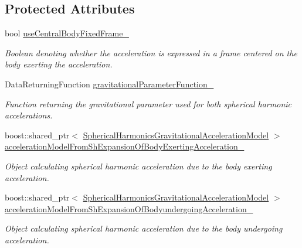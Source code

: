 \subsection*{Protected Attributes}
\begin{DoxyCompactItemize}
\item 
bool \hyperlink{classtudat_1_1gravitation_1_1MutualSphericalHarmonicsGravitationalAccelerationModel_aebd70be134dd6b05ae3c322c129dd848}{use\+Central\+Body\+Fixed\+Frame\+\_\+}
\begin{DoxyCompactList}\small\item\em Boolean denoting whether the acceleration is expressed in a frame centered on the body exerting the acceleration. \end{DoxyCompactList}\item 
Data\+Returning\+Function \hyperlink{classtudat_1_1gravitation_1_1MutualSphericalHarmonicsGravitationalAccelerationModel_a25e4191f473af6700db45554ec375374}{gravitational\+Parameter\+Function\+\_\+}\hypertarget{classtudat_1_1gravitation_1_1MutualSphericalHarmonicsGravitationalAccelerationModel_a25e4191f473af6700db45554ec375374}{}\label{classtudat_1_1gravitation_1_1MutualSphericalHarmonicsGravitationalAccelerationModel_a25e4191f473af6700db45554ec375374}

\begin{DoxyCompactList}\small\item\em Function returning the gravitational parameter used for both spherical harmonic accelerations. \end{DoxyCompactList}\item 
boost\+::shared\+\_\+ptr$<$ \hyperlink{classtudat_1_1gravitation_1_1SphericalHarmonicsGravitationalAccelerationModel}{Spherical\+Harmonics\+Gravitational\+Acceleration\+Model} $>$ \hyperlink{classtudat_1_1gravitation_1_1MutualSphericalHarmonicsGravitationalAccelerationModel_a5e471de06ab7d92a7d4710a00665e804}{acceleration\+Model\+From\+Sh\+Expansion\+Of\+Body\+Exerting\+Acceleration\+\_\+}
\begin{DoxyCompactList}\small\item\em Object calculating spherical harmonic acceleration due to the body exerting acceleration. \end{DoxyCompactList}\item 
boost\+::shared\+\_\+ptr$<$ \hyperlink{classtudat_1_1gravitation_1_1SphericalHarmonicsGravitationalAccelerationModel}{Spherical\+Harmonics\+Gravitational\+Acceleration\+Model} $>$ \hyperlink{classtudat_1_1gravitation_1_1MutualSphericalHarmonicsGravitationalAccelerationModel_a0cca31351eb37f661aea828b1cae6848}{acceleration\+Model\+From\+Sh\+Expansion\+Of\+Bodyundergoing\+Acceleration\+\_\+}
\begin{DoxyCompactList}\small\item\em Object calculating spherical harmonic acceleration due to the body undergoing acceleration. \end{DoxyCompactList}\end{DoxyCompactItemize}


